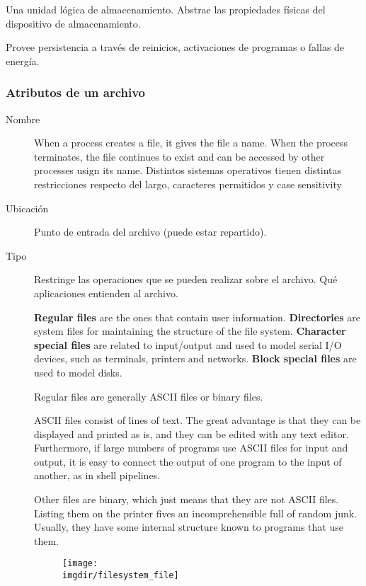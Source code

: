 \documentclass[a4paper, twoside]{article}
\newcommand{\imgdir}{../resources/images} %
\begin{document}
Una unidad lógica de almacenamiento. Abstrae las propiedades físicas del dispositivo de almacenamiento.

Provee persistencia a través de reinicios, activaciones de programas o fallas de energía.\\

\subsubsection{Atributos de un archivo}
\begin{description}
	\item[Nombre] When a process creates a file, it gives the file a name. When the process terminates, the file continues to exist and can be accessed by other processes usign its name. Distintos sistemas operativos tienen distintas restricciones respecto del largo, caracteres permitidos y case sensitivity
	
	\item[Ubicación] Punto de entrada del archivo (puede estar repartido).

	\item[Tipo] Restringe las operaciones que se pueden realizar sobre el archivo. Qué aplicaciones entienden al archivo.

	\textbf{Regular files} are the ones that contain user information. \textbf{Directories} are system files for maintaining the structure of the file system. \textbf{Character special files} are related to input/output and used to model serial I/O devices, such as terminals, printers and networks. \textbf{Block special files} are used to model disks.

	Regular files are generally ASCII files or binary files. 

	ASCII files consist of lines of text. The great advantage is that they can be displayed and printed as is, and they can be edited with any text editor. Furthermore, if large numbers of programs use ASCII files for input and output, it is easy to connect the output of one program to the input of another, as in shell pipelines.

	Other files are binary, which just means that they are not ASCII files. Listing them on the printer fives an incomprehensible full of random junk. Usually, they have some internal structure known to programs that use them.
	
	\begin{figure}[h]
		\centering
		\texttt{[image: \\imgdir/filesystem\_file]}
		\label{fig:filesystem_file}
	\end{figure}
	

\end{description}
\end{document}
